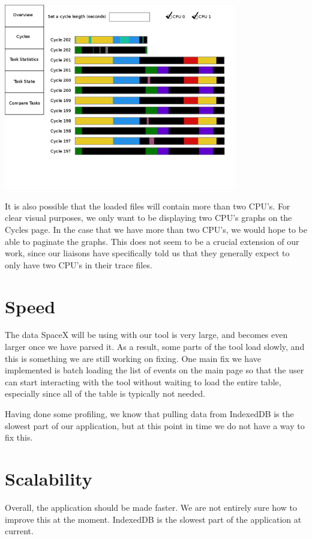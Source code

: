 \documentclass{hmcclinic}
\begin{document}
\begin{center}
\includegraphics[width=4in]{futureCycles.png}
\end{center}

It is also possible that the loaded files will contain more than two CPU's. For clear visual purposes, we only want to be displaying two CPU's graphs on the Cycles page. In the case that we have more than two CPU's, we would hope to be able to paginate the graphs. This does not seem to be a crucial extension of our work, since our liaisons have specifically told us that they generally expect to only have two CPU's in their trace files.


\section{Speed} %
The data SpaceX will be using with our tool is very large, and becomes even
larger once we have parsed it. As a result, some parts of the tool load slowly,
and this is something we are still working on fixing. One main fix we have
implemented is batch loading the list of events on the main page so that the
user can start interacting with the tool without waiting to load the entire
table, especially since all of the table is typically not needed.

Having done some profiling, we know that pulling data from IndexedDB is the
slowest part of our application, but at this point in time we do not have a way
to fix this.

\section{Scalability}
  Overall, the application should be made faster. We are not entirely sure how
  to improve this at the moment. IndexedDB is the slowest part of the
  application at current.
\end{document}
